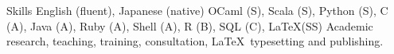 
\begin{rubric}{Skills}
  \entry*[Languages] English (fluent), Japanese (native)
   OCaml (S), Scala (S), Python (S), C (A), Java (A), Ruby (A),
  Shell (A), R (B), SQL (C), \LaTeX (SS)
  \entry*[Misc.] Academic research, teaching, training, consultation, \LaTeX\ typesetting and publishing.
\end{rubric}
